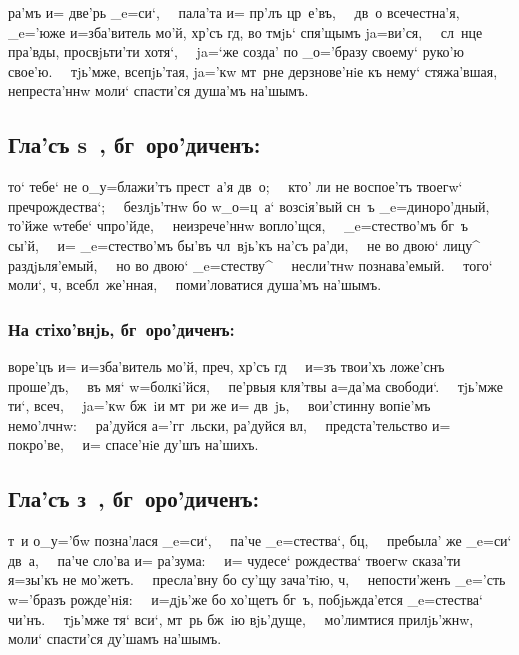 \documentclass[14pt,twoside]{extreport}
\renewcommand{\*}{~~\raise3pt\hbox{\footnotesize*}}
\begin{document}
ра'мъ и= две'рь _e=си`,\* пала'та и= пр'лъ цр~е'въ,\* дв~о
всечестна'я,\* _e='юже и=зба'витель мо'й, хр'съ гд, во тмjь`
спя'щымъ ja=ви'ся,\* сл~нце пра'вды, просвjьти'ти хотя`,\* ja=`же
созда' по _о='бразу своему` руко'ю свое'ю.\* тjь'мже, всепjь'тая,
ja='кw мт~рне дерзнове'нiе къ нему` стяжа'вшая,\* непреста'ннw моли`
спасти'ся душа'мъ на'шымъ.

\delimpict

\subsection[Гла'съ s~]{Гла'съ s~, бг~оро'диченъ:}

то` тебе` не о_у=блажи'тъ прест~а'я дв~о;\* кто' ли не
воспое'тъ твоегw` преч рождества`;\* безлjь'тнw бо w\т _о=ц~а`
возсiя'вый сн~ъ _e=диноро'дный,\* то'йже w\т тебе` ч про'йде,\*
неизрече'ннw во\-пло'щ\-ся,\* _e=стество'мъ бг~ъ сы'й,\* и= _e=стество'мъ
бы'въ чл~вjь'къ на'съ ра'ди,\* не во двою` лицу^ раздjьля'емый,\* но
во двою` _e=стеству^\* несли'тнw познава'емый.\* того` моли`, ч,
всебл~же'нная,\* поми'ловатися душа'мъ на'шымъ.

\subsubsection{На стiхо'внjь, бг~оро'диченъ:}

воре'цъ и= и=зба'витель мо'й, преч, хр'съ гд\*
и=зъ твои'хъ ложе'снъ проше'дъ,\* въ мя` w=болкi'йся,\* пе'рвыя
кля'твы а=да'ма свободи`.\* тjь'мже ти`, всеч,\* ja='кw бж~iи
мт~ри же и= дв~jь,\* вои'стинну вопiе'мъ немо'лчнw:\* ра'дуйся
а='гг~льски, ра'дуйся вл,\* предста'тельство и= покро'ве,\* и=
спасе'нiе ду'шъ на'шихъ.

\delimpict

\subsection[Гла'съ з~]{Гла'съ з~, бг~оро'диченъ:}

т~и о_у='бw позна'лася _e=си`,\* па'че _e=стества`, бц,\*
пребыла' же _e=си` дв~а,\* па'че сло'ва и= ра'зума:\* и= чудесе`
рождества` твоегw сказа'ти я=зы'къ не мо'жетъ.\* пресла'вну бо су'щу
зача'тiю, ч,\* непости'женъ _e='сть w='бразъ рожде'нiя:\*
и=дjь'же бо хо'щетъ бг~ъ, побjьжда'ется _e=стества` чи'нъ.\* тjь'мже
тя` вси`, мт~рь бж~iю вjь'дуще,\* мо'лимтися прилjь'жнw,\* моли`
спасти'ся ду'шамъ на'шымъ.
\end{document}
